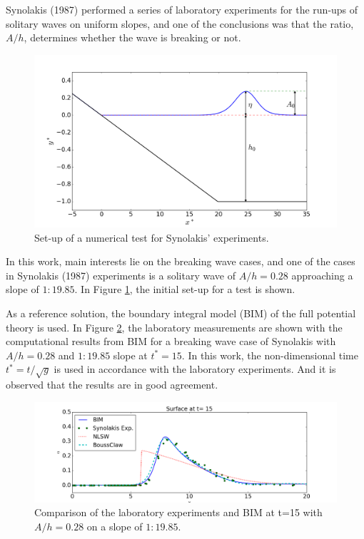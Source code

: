 \documentclass[review]{elsarticle}
\begin{document}

Synolakis (1987) \cite{synolakis1987runup} performed 
a series of laboratory experiments for the run-ups of solitary waves
on uniform slopes,
and one of the conclusions was that
the ratio, $A/h$, determines
whether the wave is breaking or not. 

\begin{figure}[!htb]
\centering
\includegraphics[width=.7\textwidth]{_fig/initial_setup.png}
\caption{Set-up of a numerical test for Synolakis' experiments.}
\label{fig:init_setup}
\end{figure}

In this work, main interests lie 
on the breaking wave cases, and 
one of the cases in Synolakis (1987) experiments is  
a solitary wave of $A/h=0.28$ approaching a slope of $1:19.85$.
In Figure \ref{fig:init_setup}, 
the initial set-up for a test is shown. 

As a reference solution, 
the boundary integral model (BIM) of the full potential theory is used.
In Figure \ref{fig:lab_bim}, the laboratory measurements
are shown with the computational results from BIM
for a breaking wave case of Synolakis with $A/h=0.28$ and $1:19.85$ slope
at $t^*=15$. In this work, the non-dimensional time $t^*=t/\sqrt{g}$ 
is used in accordance with the laboratory experiments.
And it is observed that the results are in good agreement. 

\begin{figure}[!htb]
\centering
\includegraphics[width=\textwidth]{_fig/lab_bim_t15.png}
\caption{Comparison of the laboratory experiments and BIM at t=15 with $A/h=0.28$ 
on a slope of $1:19.85$.}
\label{fig:lab_bim}
\end{figure}
\end{document}
